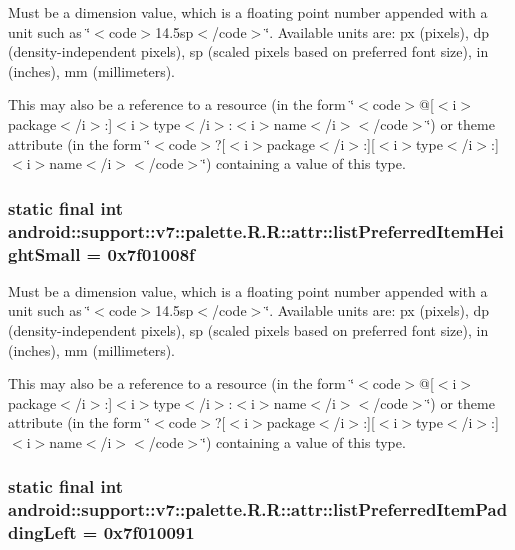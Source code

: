 Must be a dimension value, which is a floating point number appended with a unit such as \char`\"{}$<$code$>$14.5sp$<$/code$>$\char`\"{}. Available units are: px (pixels), dp (density-independent pixels), sp (scaled pixels based on preferred font size), in (inches), mm (millimeters). 

This may also be a reference to a resource (in the form \char`\"{}$<$code$>$@\mbox{[}$<$i$>$package$<$/i$>$:\mbox{]}$<$i$>$type$<$/i$>$:$<$i$>$name$<$/i$>$$<$/code$>$\char`\"{}) or theme attribute (in the form \char`\"{}$<$code$>$?\mbox{[}$<$i$>$package$<$/i$>$:\mbox{]}\mbox{[}$<$i$>$type$<$/i$>$:\mbox{]}$<$i$>$name$<$/i$>$$<$/code$>$\char`\"{}) containing a value of this type. \hypertarget{classandroid_1_1support_1_1v7_1_1palette_1_1_r_1_1attr_7c56c9c2bf7fc6b4a9e3c9417825ce10}{
\subsubsection[{listPreferredItemHeightSmall}]{\setlength{\rightskip}{0pt plus 5cm}static final int android::support::v7::palette.R.R::attr::listPreferredItemHeightSmall = 0x7f01008f}}
\label{classandroid_1_1support_1_1v7_1_1palette_1_1_r_1_1attr_7c56c9c2bf7fc6b4a9e3c9417825ce10}


Must be a dimension value, which is a floating point number appended with a unit such as \char`\"{}$<$code$>$14.5sp$<$/code$>$\char`\"{}. Available units are: px (pixels), dp (density-independent pixels), sp (scaled pixels based on preferred font size), in (inches), mm (millimeters). 

This may also be a reference to a resource (in the form \char`\"{}$<$code$>$@\mbox{[}$<$i$>$package$<$/i$>$:\mbox{]}$<$i$>$type$<$/i$>$:$<$i$>$name$<$/i$>$$<$/code$>$\char`\"{}) or theme attribute (in the form \char`\"{}$<$code$>$?\mbox{[}$<$i$>$package$<$/i$>$:\mbox{]}\mbox{[}$<$i$>$type$<$/i$>$:\mbox{]}$<$i$>$name$<$/i$>$$<$/code$>$\char`\"{}) containing a value of this type. \hypertarget{classandroid_1_1support_1_1v7_1_1palette_1_1_r_1_1attr_f44796684701a4b4f9014185387257f9}{
\subsubsection[{listPreferredItemPaddingLeft}]{\setlength{\rightskip}{0pt plus 5cm}static final int android::support::v7::palette.R.R::attr::listPreferredItemPaddingLeft = 0x7f010091}}
\label{classandroid_1_1support_1_1v7_1_1palette_1_1_r_1_1attr_f44796684701a4b4f9014185387257f9}


